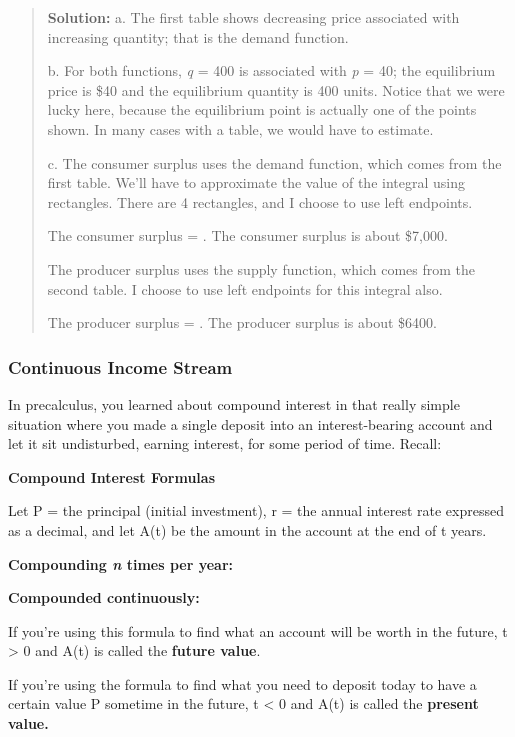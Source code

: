 \begin{quote}
\textbf{Solution:} a. The first table shows decreasing price associated
with increasing quantity; that is the demand function.

b. For both functions, \emph{q} = 400 is associated with \emph{p} = 40;
the equilibrium price is \$40 and the equilibrium quantity is 400 units.
Notice that we were lucky here, because the equilibrium point is
actually one of the points shown. In many cases with a table, we would
have to estimate.

c. The consumer surplus uses the demand function, which comes from the
first table. We'll have to approximate the value of the integral using
rectangles. There are 4 rectangles, and I choose to use left endpoints.

The consumer surplus = . The consumer surplus is about \$7,000.

The producer surplus uses the supply function, which comes from the
second table. I choose to use left endpoints for this integral also.

The producer surplus = . The producer surplus is about \$6400.
\end{quote}

\subsubsection{Continuous Income Stream}\label{continuous-income-stream}

In precalculus, you learned about compound interest in that really
simple situation where you made a single deposit into an
interest-bearing account and let it sit undisturbed, earning interest,
for some period of time. Recall:

\textbf{Compound Interest Formulas}

Let P = the principal (initial investment), r = the annual interest rate
expressed as a decimal, and let A(t) be the amount in the account at the
end of t years.

\textbf{Compounding \emph{n} times per year:}

\textbf{Compounded continuously:}

If you're using this formula to find what an account will be worth in
the future, t \textgreater{} 0 and A(t) is called the \textbf{future
value}.

If you're using the formula to find what you need to deposit today to
have a certain value P sometime in the future, t \textless{} 0 and A(t)
is called the \textbf{present value.}

